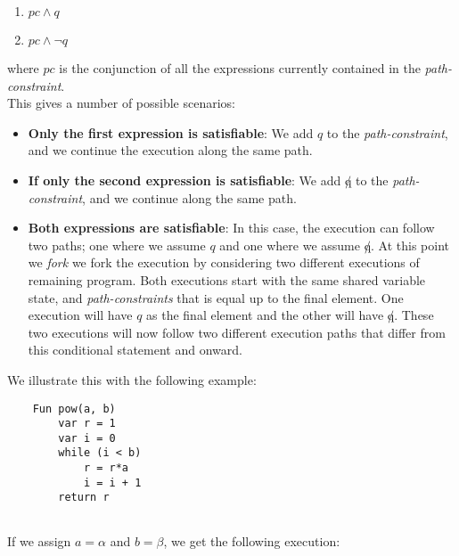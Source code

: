 		\begin{enumerate}
			\item $ pc \land q$
			\item $ pc \land \neg q$
		\end{enumerate}	
		where $pc$ is the conjunction of all the expressions currently contained in the \emph{path-constraint}.
		\\
		This gives a number of possible scenarios:	
		\begin{itemize}
			\item \textbf{Only the first expression is satisfiable}: 
			We add $q$ to the \emph{path-constraint}, and we continue the execution along the same path.
			\item \textbf{If only the second expression is satisfiable}:
			We add $\not q$ to the \emph{path-constraint}, and we continue along the same path. 
			\item \textbf{Both expressions are satisfiable}: In this case, the execution can follow two paths; one where we assume $q$ and one where we assume $\not q$. At this point we \emph{fork} we fork the execution by considering two different executions of remaining program. Both executions start with the same shared variable state, and \emph{path-constraints} that is equal up to the final element. One execution will have $q$ as the final element and the other will have $\not q$. 
			These two executions will now follow two different execution paths that differ from this conditional statement and onward.
		\end{itemize}
		
		We illustrate this with the following example:
		
	\begin{lstlisting}
	Fun pow(a, b) 
		var r = 1
		var i = 0
		while (i < b) 
			r = r*a
			i = i + 1 
		return r
		
		\end{lstlisting}
		
		If we assign $a = \alpha$ and $b = \beta$, we get the following execution:
		
